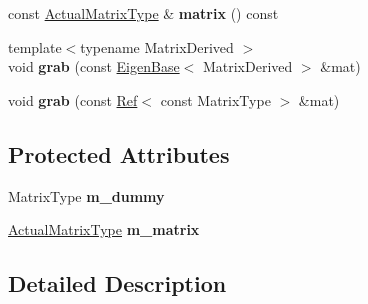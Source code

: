 \begin{DoxyCompactItemize}
\item 
\mbox{\label{class_eigen_1_1internal_1_1generic__matrix__wrapper_3_01_matrix_type_00_01false_01_4_ad5b06fe81d4917ee5b4ab2f979a7d8d1}} 
const \hyperlink{group___core___module}{Actual\+Matrix\+Type} \& {\bfseries matrix} () const
\item 
\mbox{\label{class_eigen_1_1internal_1_1generic__matrix__wrapper_3_01_matrix_type_00_01false_01_4_a8991aa3e56b8d58b3ffefac71c0bf957}} 
{\footnotesize template$<$typename Matrix\+Derived $>$ }\\void {\bfseries grab} (const \hyperlink{group___core___module_struct_eigen_1_1_eigen_base}{Eigen\+Base}$<$ Matrix\+Derived $>$ \&mat)
\item 
\mbox{\label{class_eigen_1_1internal_1_1generic__matrix__wrapper_3_01_matrix_type_00_01false_01_4_aa20affa5a6099a01f9298ce7f179339b}} 
void {\bfseries grab} (const \hyperlink{group___core___module_class_eigen_1_1_ref}{Ref}$<$ const Matrix\+Type $>$ \&mat)
\end{DoxyCompactItemize}
\subsection*{Protected Attributes}
\begin{DoxyCompactItemize}
\item 
\mbox{\label{class_eigen_1_1internal_1_1generic__matrix__wrapper_3_01_matrix_type_00_01false_01_4_a946f17150cf60c23562b6bbf7c864f86}} 
Matrix\+Type {\bfseries m\+\_\+dummy}
\item 
\mbox{\label{class_eigen_1_1internal_1_1generic__matrix__wrapper_3_01_matrix_type_00_01false_01_4_af8190764736b3b5520dd98ecf091ef50}} 
\hyperlink{group___core___module}{Actual\+Matrix\+Type} {\bfseries m\+\_\+matrix}
\end{DoxyCompactItemize}


\subsection{Detailed Description}
